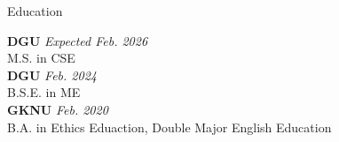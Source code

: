 \begin{rSection}{Education}

{\bf \acf{DGU}} \hfill {\em Expected Feb. 2026} \\
M.S. in \acf{CSE} \\

{\bf \acf{DGU}} \hfill {\em Feb. 2024} \\
B.S.E. in \acf{ME} \\

{\bf \ac{GKNU}} \hfill {\em Feb. 2020} \\
B.A. in Ethics Eduaction, Double Major English Education \\
    
\end{rSection}
    
    